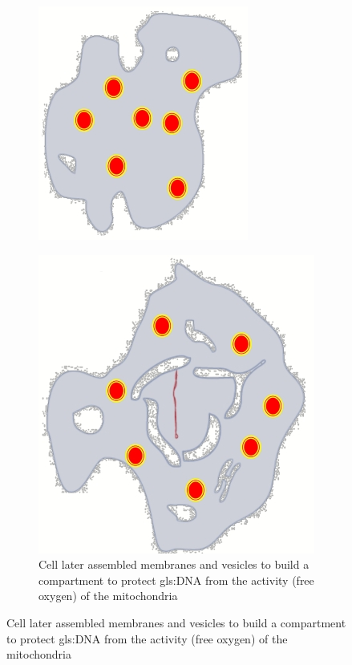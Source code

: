 \documentclass[]{article}
\begin{document}
\begin{figure}[H]
\begin{subfigure}[b]{0.45\textwidth}
		\includegraphics[width=\textwidth]{OutsideIn2}
	\end{subfigure}
	\begin{subfigure}[b]{0.45\textwidth}
		\caption{Cell later assembled membranes and vesicles to build a compartment to protect \gls{gls:DNA} from the activity (free oxygen) of the mitochondria}\label{fig:outside:in3}
		\includegraphics[width=\textwidth]{OutsideIn3}

\end{subfigure}
\end{figure}
\end{document}
